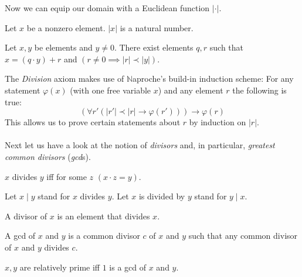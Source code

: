 \documentclass{article}
\begin{document}
  Now we can equip our domain with a Euclidean function $|\cdot|$.

  \begin{forthel}
    \begin{signature}[EucSort]
      Let $x$ be a nonzero element. $|x|$ is a natural number.
    \end{signature}

    \begin{axiom}[Division]
      Let $x,y$ be elements and $y \neq 0$. There exist elements $q,r$ such that $x = (q \cdot y) + r$ and $(r \neq 0 \implies |r| \prec |y|)$.
    \end{axiom}
  \end{forthel}

  The \textit{Division} axiom makes use of {$\mathbb{N}$aproche's} build-in induction scheme: For any statement $\varphi(x)$ (with one free variable $x$) and any element $r$ the following is true:
  $$ (\forall r' (|r'| \prec |r| \rightarrow \varphi(r'))) \rightarrow \varphi(r)$$
  This allows us to prove certain statements about $r$ by induction on $|r|$.

  \paragraph{} Next let us have a look at the notion of \textit{divisors} and, in particular, \textit{greatest common divisors} (\textit{gcd}s).

  \begin{forthel}

    \begin{definition}[DefDiv]
      $x$ divides $y$ iff for some $z$ $(x \cdot z = y)$.
    \end{definition}

    Let $x \mid y$ stand for $x$ divides $y$.
    Let $x$ is divided by $y$ stand for $y \mid x$.

    \begin{definition}[DefDvs]
      A divisor of $x$ is an element that divides $x$.
    \end{definition}

    \begin{definition}[DefGCD]
      A gcd of $x$ and $y$ is a common divisor $c$ of $x$ and $y$ such that any common divisor of $x$ and $y$ divides $c$.
    \end{definition}

    \begin{definition}[DefRel]
      $x,y$ are relatively prime iff $1$ is a gcd of $x$ and $y$.
    \end{definition}
  \end{forthel}
\end{document}
